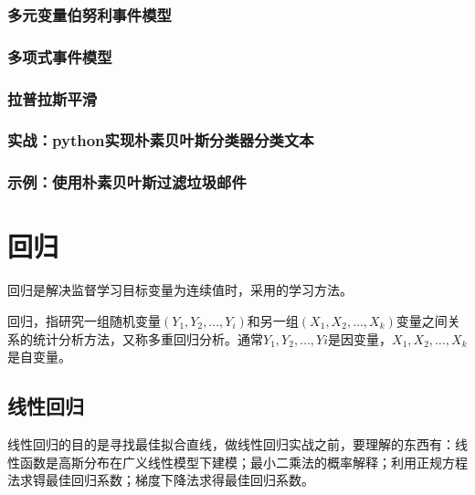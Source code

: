\subsubsection{多元变量伯努利事件模型}%
\subsubsection{多项式事件模型}
\subsubsection{拉普拉斯平滑}
\subsubsection{实战：python实现朴素贝叶斯分类器分类文本}
\subsubsection{示例：使用朴素贝叶斯过滤垃圾邮件}

\newpage
\section{回归}
回归是解决监督学习目标变量为连续值时，采用的学习方法。

回归，指研究一组随机变量$(Y_1,Y_2,\ldots,Y_i)$和另一组$(X_1,X_2,\ldots,X_k)$变量之间关系的统计分析方法，又称多重回归分析。通常$Y_1,Y_2,\ldots,Yi$是因变量，$X_1,X_2,\ldots,X_k$是自变量。

\subsection{线性回归}
线性回归的目的是寻找最佳拟合直线，做线性回归实战之前，要理解的东西有：线性函数是高斯分布在广义线性模型下建模；最小二乘法的概率解释；利用正规方程法求锝最佳回归系数；梯度下降法求得最佳回归系数。


